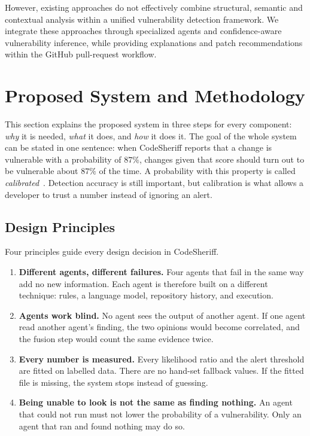 \documentclass[conference]{IEEEtran}
\begin{document}
However, existing approaches do not effectively combine structural, semantic and contextual analysis within a unified vulnerability detection framework. We integrate these approaches through specialized agents and confidence-aware vulnerability inference, while providing explanations and patch recommendations within the GitHub pull-request workflow.

\section{Proposed System and Methodology} \label{PS}

This section explains the proposed system in three steps for every
component: \emph{why} it is needed, \emph{what} it does, and \emph{how}
it does it. The goal of the whole system can be stated in one sentence:
when CodeSheriff reports that a change is vulnerable with a probability of
$87\%$, changes given that score should turn out to be vulnerable about
$87\%$ of the time. A probability with this property is called
\emph{calibrated}~\cite{guo2017calibration,niculescu2005probabilities}.
Detection accuracy is still important, but calibration is what allows a
developer to trust a number instead of ignoring an alert.

\subsection{Design Principles}
\label{subsec:principles}

Four principles guide every design decision in CodeSheriff.

\begin{enumerate}
\item \textbf{Different agents, different failures.} Four agents that fail
in the same way add no new information. Each agent is therefore built on a
different technique: rules, a language model, repository history, and
execution.
\item \textbf{Agents work blind.} No agent sees the output of another
agent. If one agent read another agent's finding, the two opinions would
become correlated, and the fusion step would count the same evidence
twice.
\item \textbf{Every number is measured.} Every likelihood ratio and the
alert threshold are fitted on labelled data. There are no hand-set
fallback values. If the fitted file is missing, the system stops instead
of guessing.
\item \textbf{Being unable to look is not the same as finding nothing.} An
agent that could not run must not lower the probability of a
vulnerability. Only an agent that ran and found nothing may do so.
\end{enumerate}
\end{document}
